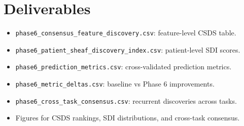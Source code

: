 \documentclass[11pt]{article}
\begin{document}
\section{Deliverables}
\begin{itemize}[leftmargin=*]
\item \texttt{phase6\_consensus\_feature\_discovery.csv}: feature-level CSDS table.
\item \texttt{phase6\_patient\_sheaf\_discovery\_index.csv}: patient-level SDI scores.
\item \texttt{phase6\_prediction\_metrics.csv}: cross-validated prediction metrics.
\item \texttt{phase6\_metric\_deltas.csv}: baseline vs Phase 6 improvements.
\item \texttt{phase6\_cross\_task\_consensus.csv}: recurrent discoveries across tasks.
\item Figures for CSDS rankings, SDI distributions, and cross-task consensus.
\end{itemize}
\end{document}
